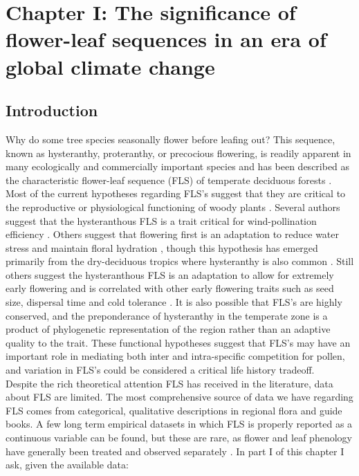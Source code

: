 \documentclass[12pt]{article}\usepackage[]{graphicx}\usepackage[]{color}
\begin{document}
\section*{Chapter I: The significance of flower-leaf sequences in an era of global climate change}
\subsection*{Introduction}
\indent\indent Why do some tree species seasonally flower before leafing out? This sequence, known as hysteranthy, proteranthy, or precocious flowering, is readily apparent in many ecologically and commercially important species and has been described as  the characteristic flower-leaf sequence (FLS) of temperate deciduous forests \citep{Rathcke1985}. Most of the current hypotheses regarding FLS's suggest that they are critical to the reproductive or physiological functioning of woody plants \citep{Gougherty2018}. Several authors suggest that the hysteranthous FLS is a trait critical for wind-pollination efficiency \citep{Whitehead1969,Ackerman2000,Friedman2009}. Others suggest that flowering first is an adaptation to reduce water stress and maintain floral hydration \citep{Franklin2016}, though this hypothesis has emerged primarily from the dry-deciduous tropics where hysteranthy is also common \citep{Janzen1967,Franklin2016}.  Still others suggest the hysteranthous FLS is an adaptation to allow for extremely early flowering and is correlated with other early flowering traits such as seed size, dispersal time and cold tolerance \citep{Gougherty2018,Bolmgren2003,Primack1987}. It is also possible that FLS's are highly conserved, and the preponderance of hysteranthy in the temperate zone is a product of phylogenetic representation of the region rather than an adaptive quality to the trait. These functional hypotheses suggest that FLS's may have an important role in mediating both inter and intra-specific competition for pollen, and variation in FLS's could be considered a critical life history tradeoff. \\
\indent Despite the rich theoretical attention FLS has received in the literature, data about FLS are limited. The most comprehensive source of data we have regarding FLS comes from categorical, qualitative descriptions in regional flora and guide books. A few long term empirical datasets in which FLS is properly reported as a continuous variable can be found, but these are rare, as flower and leaf phenology have generally been treated and observed separately \citep{Wolkovich2014}. In part I of this chapter I ask, given the available data:
\end{document}
